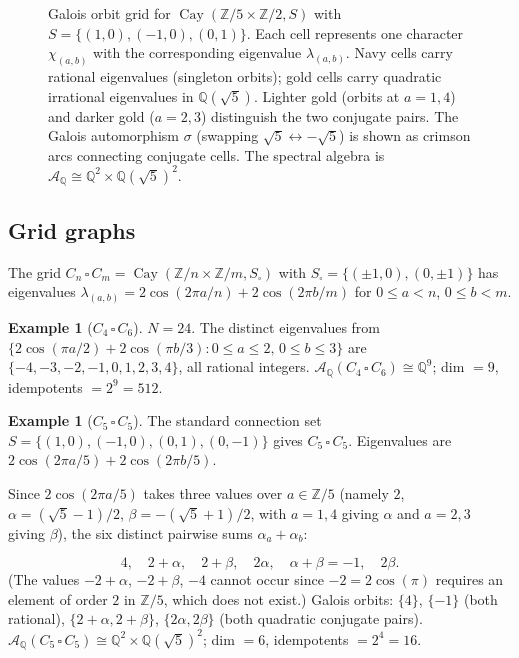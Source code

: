 \documentclass[12pt]{amsart}
\numberwithin{equation}{section}
\theoremstyle{plain}
\theoremstyle{definition}
\newtheorem{example}[theorem]{Example}
\DeclareMathOperator{\Cay}{Cay}
\newcommand{\Z}{\mathbb{Z}}
\newcommand{\Q}{\mathbb{Q}}
\newcommand{\calA}{\mathcal{A}}
\begin{document}
\begin{figure}[ht]
\caption{Galois orbit grid for $\Cay(\Z/5 \times \Z/2, S)$ with
  $S = \{(1,0),(-1,0),(0,1)\}$.  Each cell represents one character
  $\chi_{(a,b)}$ with the corresponding eigenvalue $\lambda_{(a,b)}$.
  Navy cells carry rational eigenvalues (singleton orbits); gold cells
  carry quadratic irrational eigenvalues in $\Q(\sqrt{5})$.
  Lighter gold (orbits at $a=1,4$) and darker gold ($a=2,3$) distinguish
  the two conjugate pairs.  The Galois automorphism $\sigma$ (swapping
  $\sqrt{5} \leftrightarrow -\sqrt{5}$) is shown as crimson arcs connecting
  conjugate cells.  The spectral algebra is
  $\calA_\Q \cong \Q^2 \times \Q(\sqrt{5})^2$.}
\label{fig:orbit-grid}
\end{figure}

\subsection{Grid graphs}

The grid $C_n \,\square\, C_m = \Cay(\Z/n \times \Z/m, S_\square)$ with
$S_\square = \{(\pm 1,0),(0,\pm 1)\}$ has eigenvalues
$\lambda_{(a,b)} = 2\cos(2\pi a/n) + 2\cos(2\pi b/m)$ for $0 \le a < n$,
$0 \le b < m$.

\begin{example}[$C_4 \,\square\, C_6$]
$N = 24$.  The distinct eigenvalues from
$\{2\cos(\pi a/2) + 2\cos(\pi b/3) : 0 \le a \le 2,\, 0 \le b \le 3\}$
are $\{-4, -3, -2, -1, 0, 1, 2, 3, 4\}$, all rational integers.
$\calA_\Q(C_4 \,\square\, C_6) \cong \Q^9$; dim $= 9$, idempotents
$= 2^9 = 512$.
\end{example}

\begin{example}[$C_5 \,\square\, C_5$]
The standard connection set
$S = \{(1,0),(-1,0),(0,1),(0,-1)\}$ gives
$C_5 \,\square\, C_5$.  Eigenvalues are $2\cos(2\pi a/5) + 2\cos(2\pi b/5)$.
\begin{sloppypar}
Since $2\cos(2\pi a/5)$ takes three values over $a\in\Z/5$
(namely $2$, $\alpha = (\sqrt{5}-1)/2$, $\beta = -(\sqrt{5}+1)/2$,
with $a=1,4$ giving $\alpha$ and $a=2,3$ giving $\beta$),
the six distinct pairwise sums $\alpha_a + \alpha_b$:\end{sloppypar}
\[
4,\quad 2+\alpha,\quad 2+\beta,\quad 2\alpha,\quad
\alpha+\beta = -1,\quad 2\beta.
\]
(The values $-2+\alpha$, $-2+\beta$, $-4$ cannot occur since $-2 =
2\cos(\pi)$ requires an element of order $2$ in $\Z/5$, which does not
exist.)
Galois orbits: $\{4\}$, $\{-1\}$ (both rational), $\{2+\alpha, 2+\beta\}$,
$\{2\alpha, 2\beta\}$ (both quadratic conjugate pairs).
$\calA_\Q(C_5 \,\square\, C_5) \cong \Q^2 \times \Q(\sqrt{5})^2$;
dim $= 6$, idempotents $= 2^4 = 16$.
\end{example}
\end{document}
